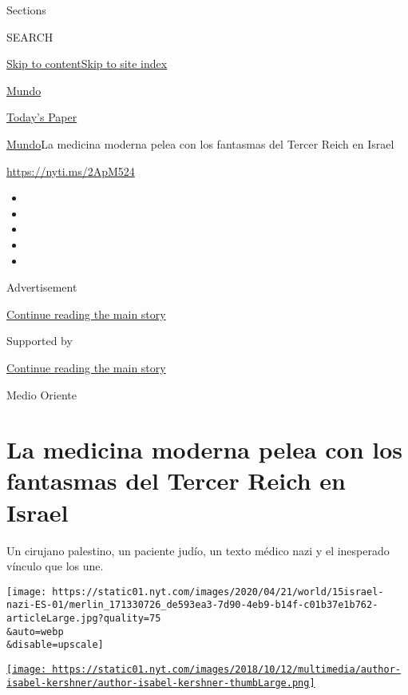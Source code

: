 Sections

SEARCH

\protect\hyperlink{site-content}{Skip to
content}\protect\hyperlink{site-index}{Skip to site index}

\href{https://www.nytimes.com/es/section/mundo}{Mundo}

\href{https://myaccount.nytimes.com/auth/login?response_type=cookie\&client_id=vi}{}

\href{https://www.nytimes.com/section/todayspaper}{Today's Paper}

\href{/es/section/mundo}{Mundo}\textbar{}La medicina moderna pelea con
los fantasmas del Tercer Reich en Israel

\url{https://nyti.ms/2ApM524}

\begin{itemize}
\item
\item
\item
\item
\item
\end{itemize}

Advertisement

\protect\hyperlink{after-top}{Continue reading the main story}

Supported by

\protect\hyperlink{after-sponsor}{Continue reading the main story}

Medio Oriente

\hypertarget{la-medicina-moderna-pelea-con-los-fantasmas-del-tercer-reich-en-israel}{%
\section{La medicina moderna pelea con los fantasmas del Tercer Reich en
Israel}\label{la-medicina-moderna-pelea-con-los-fantasmas-del-tercer-reich-en-israel}}

Un cirujano palestino, un paciente judío, un texto médico nazi y el
inesperado vínculo que los une.

\texttt{[image: https://static01.nyt.com/images/2020/04/21/world/15israel-nazi-ES-01/merlin\_171330726\_de593ea3-7d90-4eb9-b14f-c01b37e1b762-articleLarge.jpg?quality=75\\\&auto=webp\\\&disable=upscale]}

\href{https://www.nytimes.com/by/isabel-kershner}{\texttt{[image: https://static01.nyt.com/images/2018/10/12/multimedia/author-isabel-kershner/author-isabel-kershner-thumbLarge.png]}}

